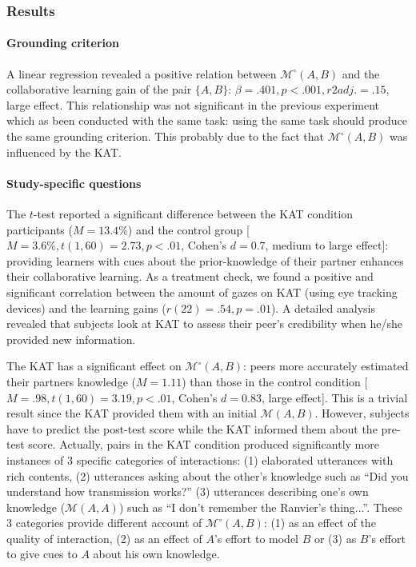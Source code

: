 \documentclass[natbib]{svjour3}
\newcommand{\gmodel}[2]{{$\mathcal{M}(#1, #2)$}}
\newcommand{\gModel}[2]{{$\mathcal{M}^{\circ}(#1, #2)$}}
\begin{document}
\subsubsection*{Results}

\paragraph{Grounding criterion} A linear regression revealed a positive relation
between \gModel{A}{B} and the collaborative learning gain of the pair $\{A,
B\}$: $\beta= .401, p < .001, r2adj. =.15$, large effect. This relationship was
not significant in the previous experiment which as been conducted with the same
task: using the same task should produce the same grounding criterion. This
probably due to the fact that \gModel{A}{B} was influenced by the KAT.

\paragraph{Study-specific questions} The $t$-test reported a significant
difference between the KAT condition participants ($M = 13.4\%$) and the control
group [$M = 3.6\%, t(1, 60) = 2.73, p < .01$, Cohen's $d = 0.7$, medium to large
effect]: providing learners with cues about the prior-knowledge of their partner
enhances their collaborative learning. As a treatment check, we found a positive
and significant correlation between the amount of gazes on KAT (using eye
tracking devices) and the learning gains ($r(22) = .54, p = .01$). A detailed
analysis revealed that subjects look at KAT to assess their peer's credibility
when he/she provided new information. 

The KAT has a significant effect on \gModel{A}{B}: peers more accurately
estimated their partners knowledge ($M = 1.11$) than those in the control
condition [$M = .98, t(1, 60) = 3.19, p < .01$, Cohen's $d = 0.83$, large
effect]. This is a trivial result since the KAT provided them with an initial
\gmodel{A}{B}. However, subjects have to predict the post-test score while the
KAT informed them about the pre-test score. Actually, pairs in the KAT condition
produced significantly more instances of 3 specific categories of interactions:
(1) elaborated utterances with rich contents,  (2) utterances asking about the
other's knowledge such as ``Did you understand how transmission works?'' (3)
utterances describing one's own knowledge (\gmodel{A}{A}) such as ``I don't
remember the Ranvier's thing...''. These 3 categories provide different account
of \gModel{A}{B}: (1) as an effect of the quality of interaction, (2) as an
effect of $A$'s effort to model $B$ or (3) as $B$'s effort to give cues to $A$ about his
own knowledge.
\end{document}
